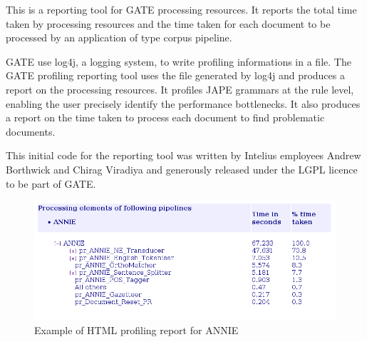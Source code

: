 %
%
%
%



This is a reporting tool for GATE processing resources. It reports the
total time taken by processing resources and the time taken for each
document to be processed by an application of type corpus pipeline.

GATE use log4j, a logging system, to write profiling informations in a
file. The GATE profiling reporting tool uses the file generated by log4j and
produces a report on the processing resources. It profiles JAPE grammars at
the rule level, enabling the user precisely identify the
performance bottlenecks. It also produces a report on the time taken to
process each document to find problematic documents.

This initial code for the reporting tool was written by Intelius employees
Andrew Borthwick and Chirag Viradiya and generously released under the LGPL
licence to be part of GATE.

\begin{figure}[htbp]
\begin{center}
\includegraphics[width=14cm]{profiling-report.png}
\end{center}
\caption{Example of HTML profiling report for ANNIE}
\label{fig:profiling-report}
\end{figure}

